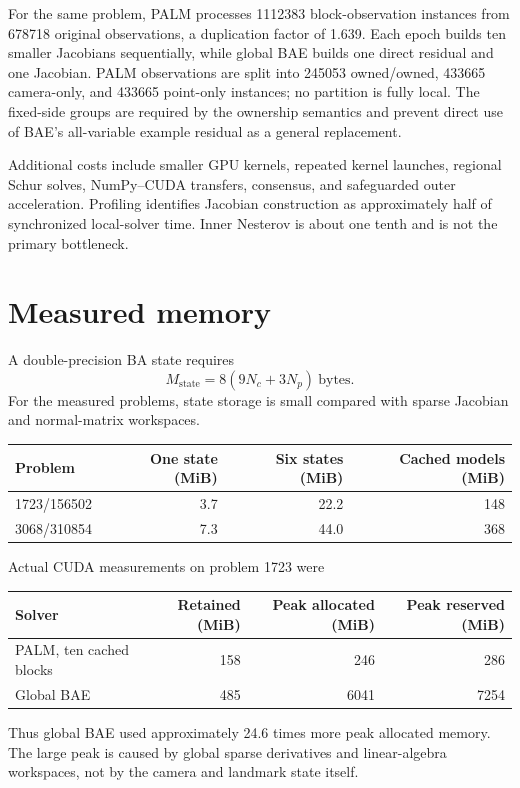 \documentclass[11pt]{article}
\begin{document}
For the same problem, PALM processes 1112383 block-observation instances from
678718 original observations, a duplication factor of 1.639.  Each epoch builds
ten smaller Jacobians sequentially, while global BAE builds one direct residual
and one Jacobian.  PALM observations are split into 245053 owned/owned, 433665
camera-only, and 433665 point-only instances; no partition is fully local.
The fixed-side groups are required by the ownership semantics and prevent direct
use of BAE's all-variable example residual as a general replacement.

Additional costs include smaller GPU kernels, repeated kernel launches,
regional Schur solves, NumPy--CUDA transfers, consensus, and safeguarded outer
acceleration.  Profiling identifies Jacobian construction as approximately
half of synchronized local-solver time.  Inner Nesterov is about one tenth and
is not the primary bottleneck.

\section{Measured memory}

A double-precision BA state requires
\begin{equation}
  M_{\mathrm{state}} = 8(9N_c + 3N_p)\ \text{bytes}.
\end{equation}
For the measured problems, state storage is small compared with sparse
Jacobian and normal-matrix workspaces.

\begin{center}
\begin{tabular}{lrrr}
  \toprule
  Problem & One state (MiB) & Six states (MiB) & Cached models (MiB) \\
  \midrule
  1723/156502 & 3.7 & 22.2 & 148 \\
  3068/310854 & 7.3 & 44.0 & 368 \\
  \bottomrule
\end{tabular}
\end{center}

Actual CUDA measurements on problem 1723 were
\begin{center}
\begin{tabular}{lrrr}
  \toprule
  Solver & Retained (MiB) & Peak allocated (MiB) & Peak reserved (MiB) \\
  \midrule
  PALM, ten cached blocks & 158 & 246 & 286 \\
  Global BAE              & 485 & 6041 & 7254 \\
  \bottomrule
\end{tabular}
\end{center}
Thus global BAE used approximately 24.6 times more peak allocated memory.  The
large peak is caused by global sparse derivatives and linear-algebra
workspaces, not by the camera and landmark state itself.
\end{document}
